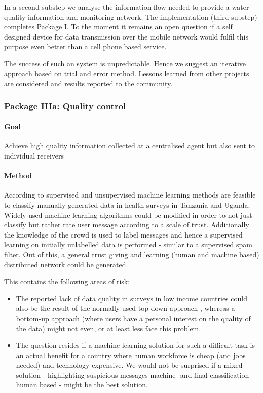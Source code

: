 \documentclass[11pt]{article}
\begin{document}
In a second substep we analyse the information flow needed to provide a water quality information and monitoring network. The implementation (third substep) completes Package I. To the moment it remains an open question if a self designed device for data transmission over the mobile network would fulfil this purpose even better than a cell phone based service. 

The success of such an system is unpredictable. Hence we suggest an iterative approach based on trial and error method. Lessons learned from other projects are considered and results reported to the community.



\subsubsection*{Package IIIa: Quality control}
\paragraph{Goal} Achieve high quality information collected at a centralised agent but also sent to individual receivers 
\paragraph{Method} According to \cite{birnbaum2012automated} supervised and unsupervised machine learning methods are feasible to classify manually generated data in health surveys in Tanzania and Uganda. Widely used machine learning algorithms could be modified in order to not just classify but rather rate user message according to a scale of trust. Additionally the knowledge of the crowd is used to label messages and hence a  supervised learning on initially unlabelled data is performed - similar to a supervised spam filter. Out of this, a general trust giving and learning (human and machine based) distributed network could be generated.

This contains the following areas of risk:

\begin{itemize}
 \item The reported lack of data quality in surveys in low income countries could also be the result of the normally used top-down approach \cite{birnbaum2012automated}, whereas a bottom-up approach  (where users have a personal interest on the quality of the data) might not even, or at least less face this problem.
 \item The question resides if a machine learning solution for such a difficult task is an actual benefit for a country where human workforce is cheap (and jobs needed) and technology expensive. We would not be surprised if a mixed solution - highlighting suspicious messages machine- and final classification human based - might be the best solution.
\end{itemize}
\end{document}

